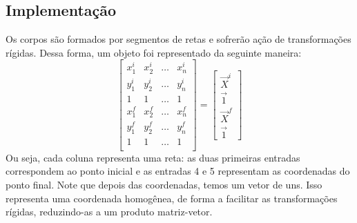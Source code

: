 \documentclass[
	12pt,				%
	oneside,			%
	a4paper,			%
	]{article}
\begin{document}
    \subsection{Implementação}
    Os corpos são formados por segmentos de retas e sofrerão ação de transformações rígidas. Dessa forma, um objeto foi representado da seguinte maneira:
    \[
        \begin{bmatrix}
            x^i_1 & x^i_2 & \dots & x^i_n \\
            y^i_1 & y^i_2 & \dots & y^i_n \\
            1     & 1     & \dots & 1 \\
            x^f_1 & x^f_2 & \dots & x^f_n \\
            y^f_1 & y^f_2 & \dots & y^f_n \\
            1     & 1     & \dots & 1 \\
        \end{bmatrix} = \begin{bmatrix}
            \vec{X}^i \\
            \vec{1} \\
            \vec{X}^f \\
            \vec{1}
        \end{bmatrix}
    \]
    Ou seja, cada coluna representa uma reta: as duas primeiras entradas correspondem ao ponto inicial e as entradas 4 e 5 representam as coordenadas do ponto final. Note que depois das coordenadas, temos um vetor de uns. Isso representa uma coordenada homogênea, de forma a facilitar as transformações rígidas, reduzindo-as a um produto matriz-vetor. 
\end{document}
